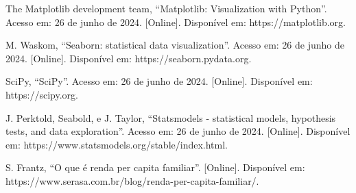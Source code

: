 \documentclass[conference]{IEEEtran}
\begin{document}
\begin{thebibliography}{1}
 The Matplotlib development team, “Matplotlib: Visualization with Python”. Acesso em: 26 de junho de 2024. [Online]. Disponível em: https://matplotlib.org.

 M. Waskom, “Seaborn: statistical data visualization”. Acesso em: 26 de junho de 2024. [Online]. Disponível em: https://seaborn.pydata.org.

 SciPy, “SciPy”. Acesso em: 26 de junho de 2024. [Online]. Disponível em: https://scipy.org.

 J. Perktold, Seabold, e J. Taylor, “Statsmodels - statistical models, hypothesis tests, and data exploration”. Acesso em: 26 de junho de 2024. [Online]. Disponível em: https://www.statsmodels.org/stable/index.html.

 S. Frantz, “O que é renda per capita familiar”. [Online]. Disponível em: https://www.serasa.com.br/blog/renda-per-capita-familiar/.

\end{thebibliography}
\end{document}
